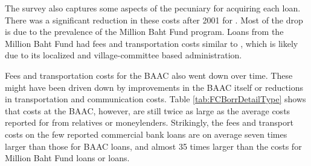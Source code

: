 \label{subsec:dataone}

The survey also captures some aspects of the pecuniary \FCFs for acquiring each loan. There was a significant reduction in these costs after 2001 for \NLC \BBBB. Most of the drop is due to the prevalence of the Million Baht Fund program. Loans from the Million Baht Fund had fees and transportation costs similar to \BBBB \LLCLY, which is likely due to its localized and village-committee based administration.

Fees and transportation costs for the BAAC also went down over time. These might have been driven down by improvements in the BAAC itself or reductions in transportation and communication costs. Table \ref{tab:FCBorrDetailType} shows that costs at the BAAC, however, are still twice as large as the average costs reported for \BBBB from relatives or moneylenders. Strikingly, the fees and transport costs on the few reported commercial bank loans are on average seven times larger than those for BAAC loans, and almost 35 times larger than the costs for Million Baht Fund loans or \LLC loans.
